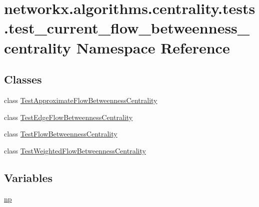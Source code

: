 \hypertarget{namespacenetworkx_1_1algorithms_1_1centrality_1_1tests_1_1test__current__flow__betweenness__centrality}{}\section{networkx.\+algorithms.\+centrality.\+tests.\+test\+\_\+current\+\_\+flow\+\_\+betweenness\+\_\+centrality Namespace Reference}
\label{namespacenetworkx_1_1algorithms_1_1centrality_1_1tests_1_1test__current__flow__betweenness__centrality}
\subsection*{Classes}
\begin{DoxyCompactItemize}
\item 
class \hyperlink{classnetworkx_1_1algorithms_1_1centrality_1_1tests_1_1test__current__flow__betweenness__centrali5aba835aefc4fe33e0352f52dae5ae14}{Test\+Approximate\+Flow\+Betweenness\+Centrality}
\item 
class \hyperlink{classnetworkx_1_1algorithms_1_1centrality_1_1tests_1_1test__current__flow__betweenness__centrali6cda9b8b6c0a181a803da6441b82c92f}{Test\+Edge\+Flow\+Betweenness\+Centrality}
\item 
class \hyperlink{classnetworkx_1_1algorithms_1_1centrality_1_1tests_1_1test__current__flow__betweenness__centrali4423af8433073615a8a3f6b60e6093bd}{Test\+Flow\+Betweenness\+Centrality}
\item 
class \hyperlink{classnetworkx_1_1algorithms_1_1centrality_1_1tests_1_1test__current__flow__betweenness__centrali2afb21a78fbdf02e64d7b1038b582239}{Test\+Weighted\+Flow\+Betweenness\+Centrality}
\end{DoxyCompactItemize}
\subsection*{Variables}
\begin{DoxyCompactItemize}
\item 
\hyperlink{namespacenetworkx_1_1algorithms_1_1centrality_1_1tests_1_1test__current__flow__betweenness__centrality_a2a52aae7dd4fbe4abfef36eb117c5f62}{np}
\end{DoxyCompactItemize}


